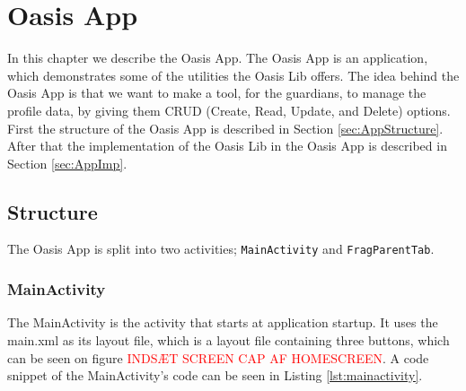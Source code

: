 \chapter{Oasis App}
\label{ch:App}
In this chapter we describe the Oasis App. The Oasis App is an application, which demonstrates some of the utilities the Oasis Lib offers. The idea behind the Oasis App is that we want to make a tool, for the guardians, to manage the profile data, by giving them CRUD (Create, Read, Update, and Delete) options. First the structure of the Oasis App is described in Section \vref{sec:AppStructure}. After that the implementation of the Oasis Lib in the Oasis App is described in Section \vref{sec:AppImp}.

\section{Structure}
\label{sec:AppStructure}
The Oasis App is split into two activities; \texttt{MainActivity} and \texttt{FragParentTab}.

\subsection{MainActivity}
The MainActivity is the activity that starts at application startup. It uses the main.xml as its layout file, which is a layout file containing three buttons, which can be seen on figure \textcolor{red}{INDS\AE{}T SCREEN CAP AF HOMESCREEN}. A code snippet of the MainActivity's code can be seen in Listing \vref{lst:mainactivity}.

